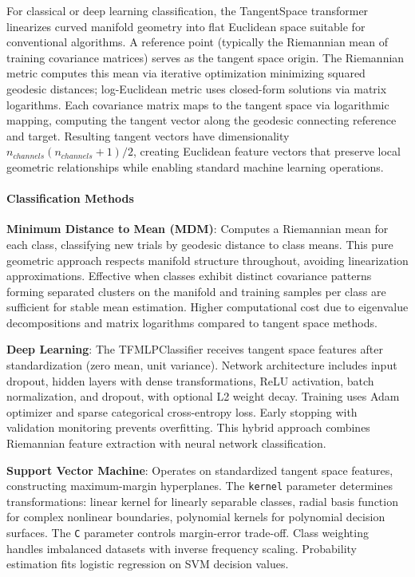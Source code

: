 \documentclass[12pt]{report}
\begin{document}
For classical or deep learning classification, the TangentSpace transformer linearizes curved manifold geometry into flat Euclidean space suitable for conventional algorithms. A reference point (typically the Riemannian mean of training covariance matrices) serves as the tangent space origin. The Riemannian metric computes this mean via iterative optimization minimizing squared geodesic distances; log-Euclidean metric uses closed-form solutions via matrix logarithms. Each covariance matrix maps to the tangent space via logarithmic mapping, computing the tangent vector along the geodesic connecting reference and target. Resulting tangent vectors have dimensionality $n_{channels}(n_{channels}+1)/2$, creating Euclidean feature vectors that preserve local geometric relationships while enabling standard machine learning operations.

\paragraph{Classification Methods}\mbox{}

\textbf{Minimum Distance to Mean (MDM)}: Computes a Riemannian mean for each class, classifying new trials by geodesic distance to class means. This pure geometric approach respects manifold structure throughout, avoiding linearization approximations. Effective when classes exhibit distinct covariance patterns forming separated clusters on the manifold and training samples per class are sufficient for stable mean estimation. Higher computational cost due to eigenvalue decompositions and matrix logarithms compared to tangent space methods.

\textbf{Deep Learning}: The TFMLPClassifier receives tangent space features after standardization (zero mean, unit variance). Network architecture includes input dropout, hidden layers with dense transformations, ReLU activation, batch normalization, and dropout, with optional L2 weight decay. Training uses Adam optimizer and sparse categorical cross-entropy loss. Early stopping with validation monitoring prevents overfitting. This hybrid approach combines Riemannian feature extraction with neural network classification.

\textbf{Support Vector Machine}: Operates on standardized tangent space features, constructing maximum-margin hyperplanes. The \verb|kernel| parameter determines transformations: linear kernel for linearly separable classes, radial basis function for complex nonlinear boundaries, polynomial kernels for polynomial decision surfaces. The \verb|C| parameter controls margin-error trade-off. Class weighting handles imbalanced datasets with inverse frequency scaling. Probability estimation fits logistic regression on SVM decision values.
\end{document}

